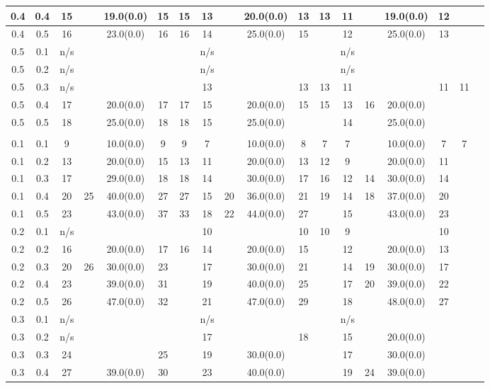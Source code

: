 \documentclass[10pt]{article}
\begin{document}
\begin{table}
\begin{tabular}{|c|c|c|c|c|c|c||c|c|c|c|c||c|c|c|c|c|c|}
	\hline
	0.4&0.4&15&  & 19.0(0.0) & 15& 15 & 13 &  & 20.0(0.0)& 13 & 13 & 11&&19.0(0.0)&12&\\ 
	\hline
	0.4&0.5&16&  & 23.0(0.0) & 16& 16 & 14 &  & 25.0(0.0) & 15 &  &12&&25.0(0.0)&13&\\ 
	\hline
	0.5&0.1&n/s&  &  & &  & n/s &  &  &  &  & n/s&&&&\\ 
	\hline
	0.5&0.2&n/s&  &  & &  & n/s &  &  &  &  & n/s&&&&\\ 
	\hline
	0.5&0.3&n/s&  &  & &  & 13 &  &  & 13 & 13 &11&&&11&11\\ 
	\hline
	0.5&0.4&17&  & 20.0(0.0) & 17& 17 & 15 &  &20.0(0.0)& 15 & 15 & 13&16&20.0(0.0)&&\\ 
	\hline
	0.5&0.5&18&  & 25.0(0.0) & 18& 18 & 15 &  & 25.0(0.0) &  &  & 14&&25.0(0.0)&&\\ 
	\hline
	  	\multicolumn{17}{|c|}{} \\
  	\hline
	0.1&0.1&9&&10.0(0.0) & 9& 9 & 7& & 10.0(0.0) & 8 & 7 & 7 &&10.0(0.0)&7&7\\ 
	\hline
	0.1&0.2&13&  & 20.0(0.0) & 15& 13 & 11 &  & 20.0(0.0) & 13 & 12 & 9&&20.0(0.0)&11&\\ 
	\hline
	0.1&0.3&17&  & 29.0(0.0) & 18& 18 & 14&  & 30.0(0.0) & 17 & 16 & 12&14&30.0(0.0)&14&\\ 
	\hline
	0.1&0.4&20&25 & 40.0(0.0) & 27& 27 &15 & 20 & 36.0(0.0) & 21 & 19 & 14&18&37.0(0.0)&20&\\ 
	\hline
	0.1&0.5&23& & 43.0(0.0) & 37& 33 &18& 22 & 44.0(0.0) & 27 &  & 15&&43.0(0.0)&23&\\ 
	\hline
	0.2&0.1&n/s&  & & & &10&  &  & 10 & 10 & 9&&&10&\\ 
	\hline
	0.2&0.2&16&  & 20.0(0.0) & 17& 16 &14 &  & 20.0(0.0) & 15 &  & 12&&20.0(0.0)&13&\\ 
	\hline
	0.2&0.3&20& 26 & 30.0(0.0) & 23&  &17 &  &30.0(0.0)& 21 &  & 14&19&30.0(0.0)&17&\\ 
	\hline
	0.2&0.4&23&  & 39.0(0.0) & 31&  & 19 &  & 40.0(0.0) & 25 &  & 17&20&39.0(0.0)&22&\\ 
	\hline
	0.2&0.5&26&  & 47.0(0.0) & 32&  & 21&  & 47.0(0.0) & 29 &  & 18&&48.0(0.0)&27&\\ 
	\hline
	0.3&0.1&n/s&  & & &  & n/s&  &  &  &  & n/s &&& & \\ 
	\hline
	0.3&0.2&n/s&  & & &  & 17 &  && 18 & & 15&&20.0(0.0)&&\\ 
	\hline
	0.3&0.3&24&  & & 25&  & 19 &  & 30.0(0.0) &  &  & 17&&30.0(0.0)&&\\ 
	\hline
	0.3&0.4&27&  & 39.0(0.0) & 30&  & 23&  & 40.0(0.0) &  &  & 19&24&39.0(0.0)&&\\ 

\end{tabular}
\end{table}
\end{document}
